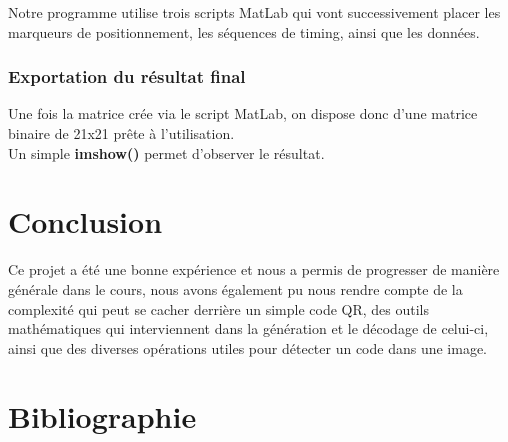 \documentclass{report}
\begin{document}
		Notre programme utilise trois scripts MatLab qui vont successivement placer les marqueurs de positionnement, les séquences de timing, ainsi que les données.\\

		\subsection{Exportation du résultat final}

			Une fois la matrice crée via le script MatLab, on dispose donc d'une matrice binaire de 21x21 prête à l'utilisation.\\

			Un simple \textbf{imshow()} permet d'observer le résultat.\\

\chapter{Conclusion}

	Ce projet a été une bonne expérience et nous a permis de progresser de manière générale dans le cours, nous avons également pu nous rendre compte de la complexité qui peut se cacher derrière un simple code QR, des outils mathématiques qui interviennent dans la génération et le décodage de celui-ci, ainsi que des diverses opérations utiles pour détecter un code dans une image.\\

\chapter{Bibliographie}

\end{document}
